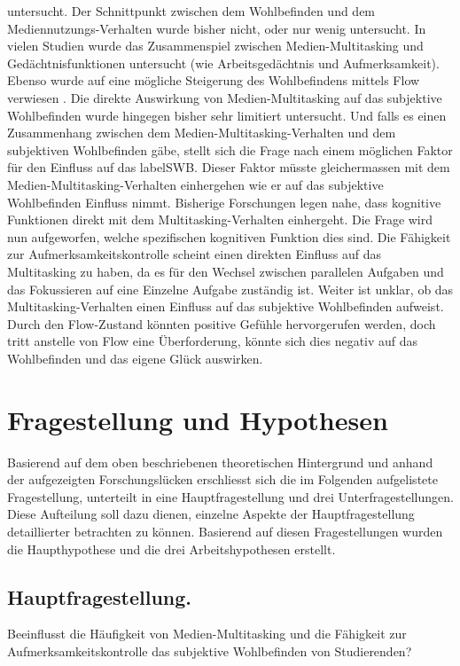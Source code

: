untersucht. Der Schnittpunkt zwischen dem Wohlbefinden und dem Mediennutzungs-Verhalten wurde bisher nicht, oder nur wenig untersucht. 
In vielen Studien wurde das Zusammenspiel zwischen Medien-Multitasking und Gedächtnisfunktionen untersucht (wie Arbeitsgedächtnis und Aufmerksamkeit). Ebenso wurde auf eine mögliche Steigerung des Wohlbefindens mittels Flow verwiesen \cite{Klingberg2008}. Die direkte Auswirkung von Medien-Multitasking auf das subjektive Wohlbefinden wurde hingegen bisher sehr limitiert untersucht. Und falls es einen Zusammenhang zwischen dem Medien-Multitasking-Verhalten und dem subjektiven Wohlbefinden gäbe, stellt sich die Frage nach einem möglichen Faktor für den Einfluss auf das \gls{labelSWB}. Dieser Faktor müsste gleichermassen mit dem Medien-Multitasking-Verhalten einhergehen wie er auf das subjektive Wohlbefinden Einfluss nimmt. Bisherige Forschungen legen nahe, dass kognitive Funktionen direkt mit dem Multitasking-Verhalten einhergeht. Die Frage wird nun aufgeworfen, welche spezifischen kognitiven Funktion dies sind. Die Fähigkeit zur Aufmerksamkeitskontrolle scheint einen direkten Einfluss auf das Multitasking zu haben, da es für den Wechsel zwischen parallelen Aufgaben und das Fokussieren auf eine Einzelne Aufgabe zuständig ist. Weiter ist unklar, ob das Multitasking-Verhalten einen Einfluss auf das subjektive Wohlbefinden aufweist. Durch den Flow-Zustand könnten positive Gefühle hervorgerufen werden, doch tritt anstelle von Flow eine Überforderung, könnte sich dies negativ auf das Wohlbefinden und das eigene Glück auswirken.

\section{Fragestellung und Hypothesen}\label{section.fragestellung}
Basierend auf dem oben beschriebenen theoretischen Hintergrund und anhand der aufgezeigten Forschungslücken erschliesst sich die im Folgenden aufgelistete Fragestellung, unterteilt in eine Hauptfragestellung und drei Unterfragestellungen. Diese Aufteilung soll dazu dienen, einzelne Aspekte der Hauptfragestellung detaillierter betrachten zu können. Basierend auf diesen Fragestellungen wurden die Haupthypothese und die drei Arbeitshypothesen erstellt.  
 
\subsection{Hauptfragestellung.} Beeinflusst die Häufigkeit von Medien-Multitasking und die Fähigkeit zur Aufmerksamkeitskontrolle das subjektive Wohlbefinden von Studierenden?

